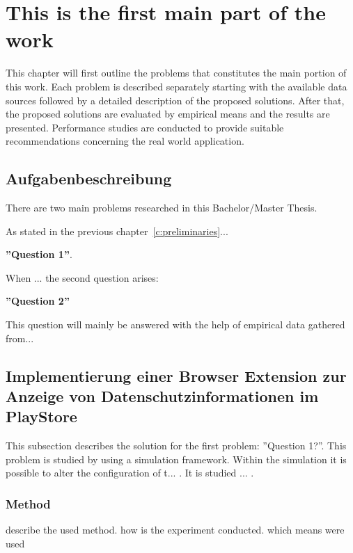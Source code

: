 \chapter{This is the first main part of the work}
\label{c:mainpart1}

This chapter will first outline the problems that constitutes the main portion of this work. Each problem is described separately starting with the available data sources followed by a detailed description of the proposed solutions. After that, the proposed solutions are evaluated by empirical means and the results are presented. Performance studies are conducted to provide suitable recommendations concerning the real world application.



\section{Aufgabenbeschreibung}
\label{s:prob_describtion}

There are two main problems researched in this Bachelor/Master Thesis.

As stated in the previous chapter~\ref{c:preliminaries}...

\textbf{''Question 1''}. 

When ... the second question arises: 

\textbf{''Question 2''}

This question will mainly be answered with the help of empirical data gathered from...


\section{Implementierung einer Browser Extension zur Anzeige von Datenschutzinformationen im PlayStore}
\label{s:solution_prob_1}

This subsection describes the solution for the first problem: ''Question 1?''. This problem is studied by using a simulation framework. Within the simulation it is possible to alter the configuration of t... . It is studied ... .



\subsection{Method}
\label{ss:method}

describe the used method. how is the experiment conducted. which means were used

